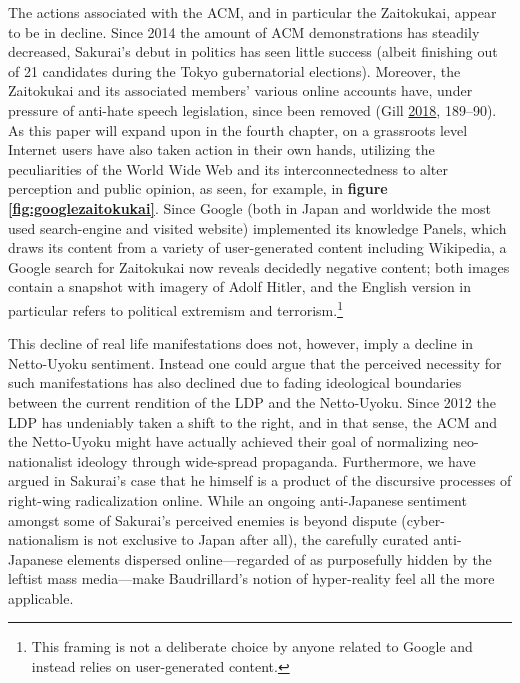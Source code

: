 \documentclass[10pt,british,A4paper,oneside]{memoir}
\begin{document}
The actions associated with the ACM, and in particular the Zaitokukai,
appear to be in decline. Since 2014 the amount of ACM demonstrations has
steadily decreased, Sakurai's debut in politics has seen little success
(albeit finishing  out of 21 candidates during the Tokyo
gubernatorial elections). Moreover, the Zaitokukai and its associated
members' various online accounts have, under pressure of anti-hate
speech legislation, since been removed (Gill
\protect\hyperlink{ref-gill_nativist_2018}{2018}, 189--90). As this
paper will expand upon in the fourth chapter, on a grassroots level
Internet users have also taken action in their own hands, utilizing the
peculiarities of the World Wide Web and its interconnectedness to
alter perception and public opinion, as seen, for example, in
\textbf{figure \ref{fig:googlezaitokukai}}. Since Google (both in Japan
and worldwide the most used search-engine and visited website)
implemented its knowledge Panels, which draws its content from a variety
of user-generated content including Wikipedia, a Google search for
Zaitokukai now reveals decidedly negative content; both images contain a
snapshot with imagery of Adolf Hitler, and the English version in
particular refers to political extremism and terrorism.\footnote{This
  framing is not a deliberate choice by anyone related to Google and
  instead relies on user-generated content.}

This decline of real life manifestations does not, however, imply a
decline in Netto-Uyoku sentiment. Instead one could argue that the
perceived necessity for such manifestations has also declined due to
fading ideological boundaries between the current rendition of the LDP
and the Netto-Uyoku. Since 2012 the LDP has undeniably taken a shift to
the right, and in that sense, the ACM and the Netto-Uyoku might have
actually achieved their goal of normalizing neo-nationalist ideology
through wide-spread propaganda. Furthermore, we have argued in Sakurai's
case that he himself is a product of the discursive processes of
right-wing radicalization online. While an ongoing anti-Japanese
sentiment amongst some of Sakurai's perceived enemies is beyond dispute
(cyber-nationalism is not exclusive to Japan after all), the carefully
curated anti-Japanese elements dispersed online---regarded of as
purposefully hidden by the leftist mass media---make Baudrillard's
notion of hyper-reality feel all the more applicable.
\end{document}
